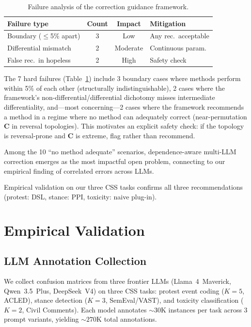 \documentclass[11pt,letterpaper]{article}
\begin{document}
\begin{table}[t]
\centering
\small
\caption{Failure analysis of the correction guidance framework.}
\label{tab:correction_failure}
\begin{tabular}{@{}lccl@{}}
\toprule
\textbf{Failure type} & \textbf{Count} & \textbf{Impact} & \textbf{Mitigation} \\
\midrule
Boundary ($\leq$5\% apart) & 3 & Low & Any rec.\ acceptable \\
Differential mismatch & 2 & Moderate & Continuous param. \\
False rec.\ in hopeless & 2 & High & Safety check \\
\bottomrule
\end{tabular}
\end{table}

The 7 hard failures (Table~\ref{tab:correction_failure}) include 3 boundary cases where methods perform within 5\% of each other (structurally indistinguishable), 2 cases where the framework's non-differential/differential dichotomy misses intermediate differentiality, and---most concerning---2 cases where the framework recommends a method in a regime where no method can adequately correct (near-permutation $\mathbf{C}$ in reversal topologies).
This motivates an explicit safety check: if the topology is reversal-prone and $\mathbf{C}$ is extreme, flag rather than recommend.

Among the 10 ``no method adequate'' scenarios, dependence-aware multi-LLM correction emerges as the most impactful open problem, connecting to our empirical finding of correlated errors across LLMs.

Empirical validation on our three CSS tasks confirms all three recommendations (protest: DSL, stance: PPI, toxicity: naive plug-in).

\section{Empirical Validation}
\label{sec:empirical}

\subsection{LLM Annotation Collection}

We collect confusion matrices from three frontier LLMs (Llama~4~Maverick, Qwen~3.5~Plus, DeepSeek~V4) on three CSS tasks: protest event coding ($K=5$, ACLED), stance detection ($K=3$, SemEval/VAST), and toxicity classification ($K=2$, Civil Comments).
Each model annotates ${\sim}30$K instances per task across 3 prompt variants, yielding ${\sim}270$K total annotations.
\end{document}
